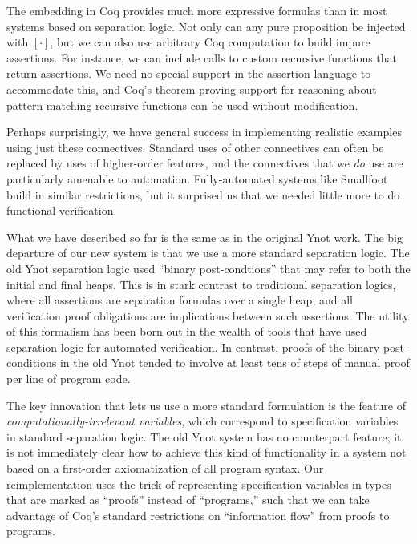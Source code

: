 \documentclass[preprint,nocopyrightspace]{sigplanconf}
\begin{document}
The embedding in Coq provides much more expressive formulas than in most systems based on separation logic.  Not only can any pure proposition be injected with $[\cdot]$, but we can also use arbitrary Coq computation to build impure assertions.  For instance, we can include calls to custom recursive functions that return assertions.  We need no special support in the assertion language to accommodate this, and Coq's theorem-proving support for reasoning about pattern-matching recursive functions can be used without modification.

Perhaps surprisingly, we have general success in implementing realistic examples using just these connectives.  Standard uses of other connectives can often be replaced by uses of higher-order features, and the connectives that we \emph{do} use are particularly amenable to automation.  Fully-automated systems like Smallfoot build in similar restrictions, but it surprised us that we needed little more to do functional verification.

\medskip

What we have described so far is the same as in the original Ynot
work.  The big departure of our new system is that we use a more
standard separation logic.  The old Ynot separation logic used
``binary post-condtions'' that may refer to both the initial and final
heaps.  This is in stark contrast to traditional separation logics,
where all assertions are separation formulas over a single heap, and
all verification proof obligations are implications between such
assertions.  The utility of this formalism has been born out in the
wealth of tools that have used separation logic for automated
verification.  In contrast, proofs of the binary post-conditions in the
old Ynot tended to involve at least tens of steps of manual proof per
line of program code.

The key innovation that lets us use a more standard formulation is the feature of \emph{computationally-irrelevant variables}, which correspond to specification variables in standard separation logic.  The old Ynot system has no counterpart feature; it is not immediately clear how to achieve this kind of functionality in a system not based on a first-order axiomatization of all program syntax.  Our reimplementation uses the trick of representing specification variables in types that are marked as ``proofs'' instead of ``programs,'' such that we can take advantage of Coq's standard restrictions on ``information flow'' from proofs to programs.
\end{document}
